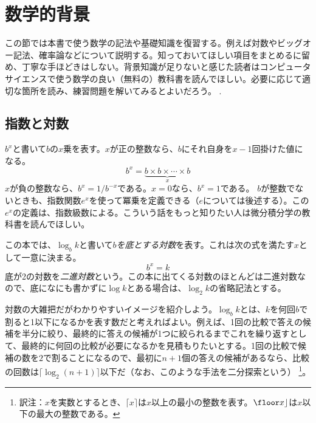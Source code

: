 \section{数学的背景}
この節では本書で使う数学の記法や基礎知識を復習する。例えば対数やビッグオー記法、確率論などについて説明する。知っておいてほしい項目をまとめるに留め、丁寧な手ほどきはしない。背景知識が足りないと感じた読者はコンピュータサイエンスで使う数学の良い（無料の）教科書を読んでほしい。必要に応じて適切な箇所を読み、練習問題を解いてみるとよいだろう。
\cite{llm11}.

\subsection{指数と対数}

$b^x$と書いて$b$の$x$乗を表す。$x$が正の整数なら、$b$にそれ自身を$x-1$回掛けた値になる。
\[
    b^x = \underbrace{b\times b\times \cdots \times b}_{x}
\]
$x$が負の整数なら、$b^x=1/b^{-x}$である。$x=0$なら、$b^x=1$である。
$b$が整数でないときも、指数関数$e^x$を使って冪乗を定義できる（$e$については後述する）。この$e^x$の定義は、指数級数による。こういう話をもっと知りたい人は微分積分学の教科書を読んでほしい。

この本では、$\log_b k$と書いて\emph{$b$を底とする対数}を表す。これは次の式を満たす$x$として一意に決まる。
\[
    b^{x} = k
\]
底が2の対数を\emph{二進対数}という。この本に出てくる対数のほとんどは二進対数なので、底になにも書かずに$\log k$とある場合は、$\log_2 k$の省略記法とする。
%
%

対数の大雑把だがわかりやすいイメージを紹介しよう。$\log_b k$とは、$k$を何回$b$で割ると1以下になるかを表す数だと考えればよい。例えば、1回の比較で答えの候補を半分に絞り、最終的に答えの候補が1つに絞られるまでこれを繰り返すとして、最終的に何回の比較が必要になるかを見積もりたいとする。1回の比較で候補の数を$2$で割ることになるので、最初に$n+1$個の答えの候補があるなら、比較の回数は$\lceil \log_2(n+1) \rceil$以下だ（なお、このような手法を二分探索という）%
\footnote{訳注：$x$を実数とするとき、$\lceil x \rceil$は$x$以上の最小の整数を表す。$\floor x \rfloor$は$x$以下の最大の整数である。}。

